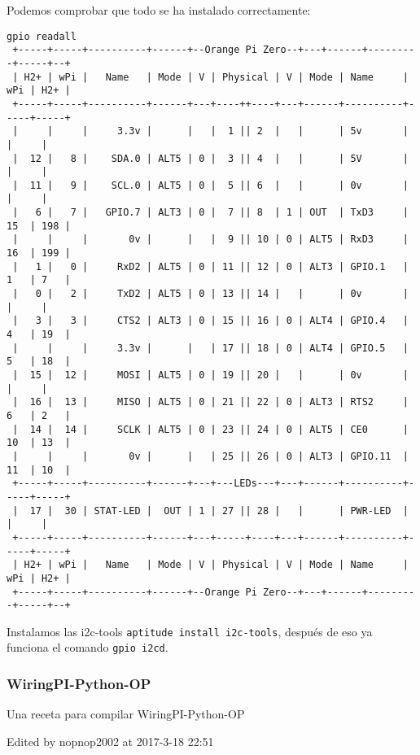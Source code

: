 \documentclass[12pt,spanish,]{scrartcl}
\begin{document}
Podemos comprobar que todo se ha instalado correctamente:

\begin{verbatim}
gpio readall
 +-----+-----+----------+------+--Orange Pi Zero--+---+------+---------+-----+--+
 | H2+ | wPi |   Name   | Mode | V | Physical | V | Mode | Name     | wPi | H2+ |
 +-----+-----+----------+------+---+----++----+---+------+----------+-----+-----+
 |     |     |     3.3v |      |   |  1 || 2  |   |      | 5v       |     |     |
 |  12 |   8 |    SDA.0 | ALT5 | 0 |  3 || 4  |   |      | 5V       |     |     |
 |  11 |   9 |    SCL.0 | ALT5 | 0 |  5 || 6  |   |      | 0v       |     |     |
 |   6 |   7 |   GPIO.7 | ALT3 | 0 |  7 || 8  | 1 | OUT  | TxD3     | 15  | 198 |
 |     |     |       0v |      |   |  9 || 10 | 0 | ALT5 | RxD3     | 16  | 199 |
 |   1 |   0 |     RxD2 | ALT5 | 0 | 11 || 12 | 0 | ALT3 | GPIO.1   | 1   | 7   |
 |   0 |   2 |     TxD2 | ALT5 | 0 | 13 || 14 |   |      | 0v       |     |     |
 |   3 |   3 |     CTS2 | ALT3 | 0 | 15 || 16 | 0 | ALT4 | GPIO.4   | 4   | 19  |
 |     |     |     3.3v |      |   | 17 || 18 | 0 | ALT4 | GPIO.5   | 5   | 18  |
 |  15 |  12 |     MOSI | ALT5 | 0 | 19 || 20 |   |      | 0v       |     |     |
 |  16 |  13 |     MISO | ALT5 | 0 | 21 || 22 | 0 | ALT3 | RTS2     | 6   | 2   |
 |  14 |  14 |     SCLK | ALT5 | 0 | 23 || 24 | 0 | ALT5 | CE0      | 10  | 13  |
 |     |     |       0v |      |   | 25 || 26 | 0 | ALT3 | GPIO.11  | 11  | 10  |
 +-----+-----+----------+------+---+---LEDs---+---+------+----------+-----+-----+
 |  17 |  30 | STAT-LED |  OUT | 1 | 27 || 28 |   |      | PWR-LED  |     |     |
 +-----+-----+----------+------+---+-----+----+---+------+----------+-----+-----+
 | H2+ | wPi |   Name   | Mode | V | Physical | V | Mode | Name     | wPi | H2+ |
 +-----+-----+----------+------+--Orange Pi Zero--+---+------+---------+-----+--+
\end{verbatim}

Instalamos las i2c-tools \texttt{aptitude\ install\ i2c-tools}, después
de eso ya funciona el comando \texttt{gpio\ i2cd}.

\hypertarget{wiringpi-python-op}{%
\subsubsection{WiringPI-Python-OP}\label{wiringpi-python-op}}

Una receta para compilar WiringPI-Python-OP

Edited by nopnop2002 at 2017-3-18 22:51
\end{document}
